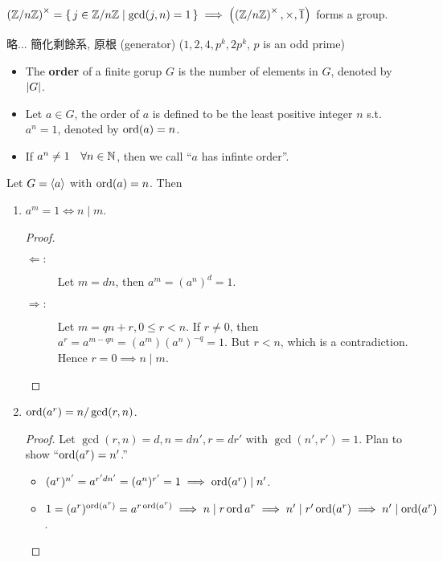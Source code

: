 \begin{definition}
  $\left( {\mathbb{Z}}/{n\mathbb{Z}} \right)^\times = \{\, j \in {\mathbb{Z}}/{n\mathbb{Z}} \mid
  \gcd(j,n) = 1 \,\} \implies \left(\left( {\mathbb{Z}}/{n\mathbb{Z}} \right)^\times,
  \times, \overline{1} \right)$ forms a group.
\end{definition}

\begin{example}
  略... 簡化剩餘系, 原根 (generator) ($1, 2, 4, p^k, 2p^k$, $p$ is an odd prime)
\end{example}

\begin{definition} \mbox{}
  \begin{itemize}
    \item The {\bf order} of a finite gorup $G$ is the number of elements in
      $G$, denoted by $\lvert G\rvert$.
    \item Let $a \in G$, the order of $a$ is defined to be the least positive
      integer $n$ s.t. $a^n = 1$, denoted by $\operatorname{ord}(a) = n$.
    \item If $a^n \ne 1 \quad \forall n \in \mathbb{N}$, then we call
      ``$a$ has infinte order''.
  \end{itemize}
\end{definition}

\begin{prop}
  Let $G = \langle a\rangle$ with $\operatorname{ord}(a) = n$. Then
  \begin{enumerate}
    \item $a^m = 1 \iff n \mid m$.
      \begin{proof} \mbox{}
        \begin{description}
          \item[$\Leftarrow:$] Let $m = dn$, then $a^m = (a^n)^d = 1$.
          \item[$\Rightarrow:$] Let $m = qn + r, 0 \le r < n$.
            If $r \ne 0$, then $a^r = a^{m - qn} = (a^m)(a^n)^{-q} = 1$.
            But $r < n$, which is a contradiction.
            Hence $r = 0 \implies n \mid m$. \qedhere
        \end{description}
      \end{proof}
    \item $\operatorname{ord}(a^r) = n / \gcd(r, n)$.
      \begin{proof}
        Let $\gcd(r, n) = d, n = dn', r = dr'$ with $\gcd(n', r') = 1$.
        Plan to show ``$\operatorname{ord}(a^r) = n'$.''
        \begin{itemize}
          \item $(a^r)^{n'} = a^{r'dn'} = (a^n)^{r'} = 1 \implies \operatorname{ord}(a^r) \mid n'$.
          \item $1 = (a^r)^{\operatorname{ord}(a^r)} = a^{r \operatorname{ord}(a^r)} \implies
            n \mid r \operatorname{ord}{a^r} \implies n' \mid r' \operatorname{ord}(a^r) \implies
            n' \mid \operatorname{ord}(a^r)$.
        \end{itemize}
      \end{proof}
  \end{enumerate}
\end{prop}

